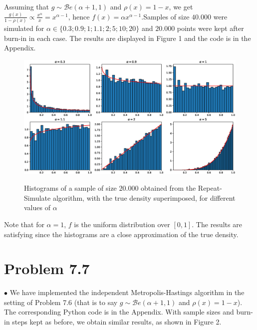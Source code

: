 \documentclass[a4paper,11pt, hidelinks]{article}
\begin{document}
Assuming that $g\sim \mathcal Be(\alpha+1,1)$ and $\rho(x) = 1-x$, we get $\frac{g(x)}{1-\rho(x)} \propto \frac{x^{\alpha}}{x}=x^{\alpha-1}$, hence $f(x) = \alpha x^{\alpha-1}$.\newline \newline Samples of size $40.000$ were simulated for $\alpha \in \{0.3;0.9;1;1.1;2;5;10;20\}$ and $20.000$ points were kept after burn-in in each case. The results are displayed in Figure 1 and the code is in the Appendix.
\begin{figure}[H]
\centering
 \includegraphics[scale=0.5]{plot.eps}  \\
\caption{Histograms of a sample of size $20.000$ obtained from the Repeat-Simulate algorithm, with the true density superimposed, for different values of $\alpha$}
\end{figure}

\noindent Note that for $\alpha=1$, $f$ is the uniform distribution over $[0,1]$. The results are satisfying since the histograms are a close approximation of the true density.


\section*{Problem 7.7}

$\bullet$ We have implemented the independent Metropolis-Hastings algorithm in the setting of Problem 7.6 (that is to say $g\sim \mathcal Be(\alpha+1,1)$ and $\rho(x) = 1-x$). The corresponding Python code is in the Appendix. With sample sizes and burn-in steps kept as before, we obtain similar results, as shown in Figure 2.
\end{document}
